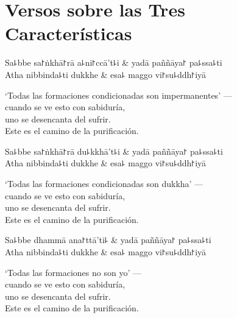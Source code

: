 \chapter{Versos sobre las Tres Características}


\begin{leader}
\end{leader}

\begin{twochants}
  Sa꜕bbe sa꜓ṅkhā꜓rā a꜕ni꜓ccā't꜕i & yadā paññāya꜓ pa꜕ssa꜕ti \\
  Atha nibbinda꜕ti dukkhe & esa꜕ maggo vi꜓su꜕ddh꜓iyā \\
\end{twochants}

\begin{english}
  ‘Todas las formaciones condicionadas son impermanentes’ ---\\
  cuando se ve esto con sabiduría,\\
  uno se desencanta del sufrir.\\
  Este es el camino de la purificación.
\end{english}

\begin{twochants}
  Sa꜕bbe sa꜓ṅkhā꜓rā du꜕kkhā't꜕i & yadā paññāya꜓ pa꜕ssa꜕ti \\
  Atha nibbinda꜕ti dukkhe & esa꜕ maggo vi꜓su꜕ddh꜓iyā \\
\end{twochants}

\begin{english}
  ‘Todas las formaciones condicionadas son dukkha’ ---\\
  cuando se ve esto con sabiduría,\\
  uno se desencanta del sufrir.\\
  Este es el camino de la purificación.
\end{english}

\begin{twochants}
  Sa꜕bbe dhammā ana꜓ttā'ti꜕ & yadā paññāya꜓ pa꜕ssa꜕ti \\
  Atha nibbinda꜕ti dukkhe & esa꜕ maggo vi꜓su꜕ddh꜓iyā \\
\end{twochants}

\begin{english}
  ‘Todas las formaciones no son yo’ ---\\
  cuando se ve esto con sabiduría,\\
  uno se desencanta del sufrir.\\
  Este es el camino de la purificación.
\end{english}

